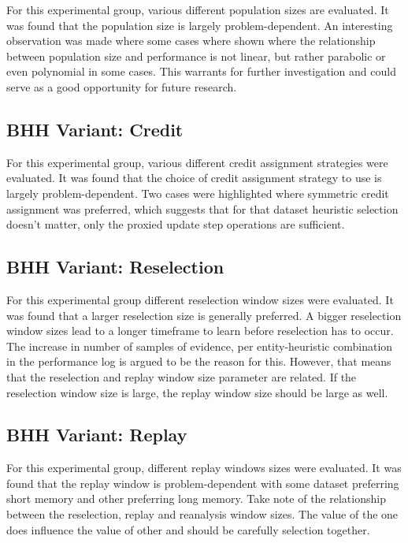 For this experimental group, various different population sizes are evaluated. It was found that the population size is largely problem-dependent. An interesting observation was made where some cases where shown where the relationship between population size and performance is not linear, but rather parabolic or even polynomial in some cases. This warrants for further investigation and could serve as a good opportunity for future research.

\subsection{\ac{BHH} Variant: Credit}
\label{sec:conclusion:results:summary:credit}

For this experimental group, various different credit assignment strategies were evaluated. It was found that the choice of credit assignment strategy to use is largely problem-dependent. Two cases were highlighted where symmetric credit assignment was preferred, which suggests that for that dataset heuristic selection doesn't matter, only the proxied update step operations are sufficient.

\subsection{\ac{BHH} Variant: Reselection}
\label{sec:conclusion:results:summary:reselection}

For this experimental group different reselection window sizes were evaluated. It was found that a larger reselection size is generally preferred. A bigger reselection window sizes lead to a longer timeframe to learn before reselection has to occur. The increase in number of samples of evidence, per entity-heuristic combination in the performance log is argued to be the reason for this. However, that means that the reselection and replay window size parameter are related. If the reselection window size is large, the replay window size should be large as well.

\subsection{\ac{BHH} Variant: Replay}
\label{sec:conclusion:results:summary:replay}

For this experimental group, different replay windows sizes were evaluated. It was found that the replay window is problem-dependent with some dataset preferring short memory and other preferring long memory. Take note of the relationship between the reselection, replay and reanalysis window sizes. The value of the one does influence the value of other and should be carefully selection together.


